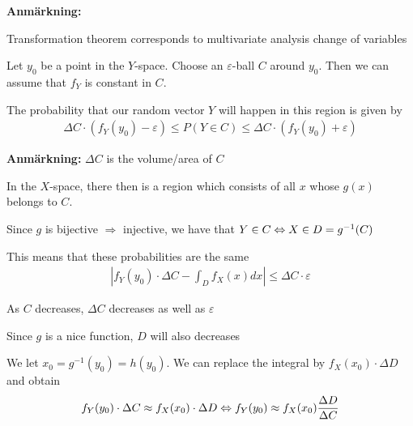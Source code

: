 \par\bigskip
\noindent\textbf{Anmärkning:}\par
\noindent Transformation theorem corresponds to multivariate analysis change of variables
\par\bigskip
\begin{prf}{}
  Let $y_0$ be a point in the $Y$-space. Choose an $\varepsilon$-ball $C$ around $y_0$. Then we can assume that $f_Y$ is constant in $C$.
  \par\bigskip
  \noindent The probability that our random vector $Y$ will happen in this region is given by
  \begin{equation*}
    \begin{gathered}
      \Delta C\cdot(f_Y(y_0)-\varepsilon)\leq P(Y\in C)\leq \Delta C\cdot(f_Y(y_0)+\varepsilon)
    \end{gathered}
  \end{equation*}
  \par\bigskip
  \noindent\textbf{Anmärkning:} $\Delta C$ is the volume/area of $C$
  \par\bigskip
  \noindent In the $X$-space, there then is a region which consists of all $x$ whose $g(x)$ belongs to $C$.\par
  \noindent Since $g$ is bijective $\Rightarrow$ injective, we have that $Y\in C\Leftrightarrow X\in D = g^{-1}(C)$
  \par\bigskip
  \noindent This means that these probabilities are the same
  \begin{equation*}
    \begin{gathered}
      \left|f_Y(y_0)\cdot\Delta C-\int_D f_X(x)dx\right|\leq\Delta C\cdot\varepsilon
    \end{gathered}
  \end{equation*}
  \par\bigskip
  \noindent As $C$ decreases, $\Delta C$ decreases as well as $\varepsilon$\par
  \noindent Since $g$ is a nice function, $D$ will also decreases\par
  \noindent We let $x_0 = g^{-1}(y_0) = h(y_0)$. We can replace the integral by $f_X(x_0)\cdot\Delta D$ and obtain
  \begin{equation*}
    \begin{gathered}
      f_Y(y_0)\cdot\Delta C\approx f_X(x_0)\cdot\Delta D\Leftrightarrow f_Y(y_0)\approx f_X(x_0)\dfrac{\Delta D}{\Delta C}
    \end{gathered}
  \end{equation*}

\end{prf}
